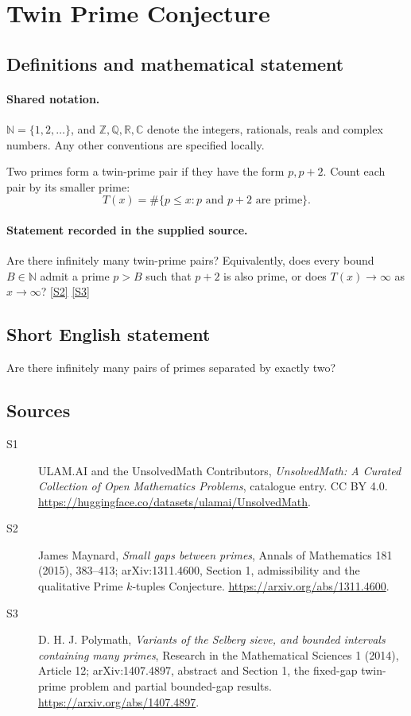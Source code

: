 \documentclass[11pt]{article}
\newcommand{\sref}[2]{\hyperlink{source:#1:#2}{[S#2]}}
\begin{document}
\section{Twin Prime Conjecture}\label{statement}

\subsection{Definitions and mathematical statement}

\paragraph{Shared notation.}$\mathbb N=\{1,2,\ldots\}$, and $\mathbb Z,\mathbb Q,\mathbb R,\mathbb C$ denote the integers, rationals, reals and complex numbers. Any other conventions are specified locally.


Two primes form a twin-prime pair if they have the form
\(p,p+2\). Count each pair by its smaller prime:
\[
                   T(x)=\#\{p\le x:p\text{ and }p+2\text{ are prime}\}.
\]
\paragraph{Statement recorded in the supplied source.}
Are there infinitely many twin-prime pairs? Equivalently,
does every bound \(B\in\mathbb N\) admit a prime \(p>B\) such that
\(p+2\) is also prime, or does \(T(x)\to\infty\) as \(x\to\infty\)? \sref{statement}{2} \sref{statement}{3}
\subsection{Short English statement}
Are there infinitely many pairs of primes separated by exactly two?
\subsection{Sources}
\begin{description}
\item[\hypertarget{source:statement:1}{S1}] ULAM.AI and the UnsolvedMath Contributors, \emph{UnsolvedMath: A Curated Collection of Open Mathematics Problems}, catalogue entry. CC BY 4.0. \url{https://huggingface.co/datasets/ulamai/UnsolvedMath}.
\item[\hypertarget{source:statement:2}{S2}] James Maynard, \emph{Small gaps between primes}, Annals of Mathematics 181 (2015), 383--413; arXiv:1311.4600, Section 1, admissibility and the qualitative Prime $k$-tuples Conjecture. \url{https://arxiv.org/abs/1311.4600}.
\item[\hypertarget{source:statement:3}{S3}] D. H. J. Polymath, \emph{Variants of the Selberg sieve, and bounded intervals containing many primes}, Research in the Mathematical Sciences 1 (2014), Article 12; arXiv:1407.4897, abstract and Section 1, the fixed-gap twin-prime problem and partial bounded-gap results. \url{https://arxiv.org/abs/1407.4897}.
\end{description}
\label{end:statement}
\end{document}
